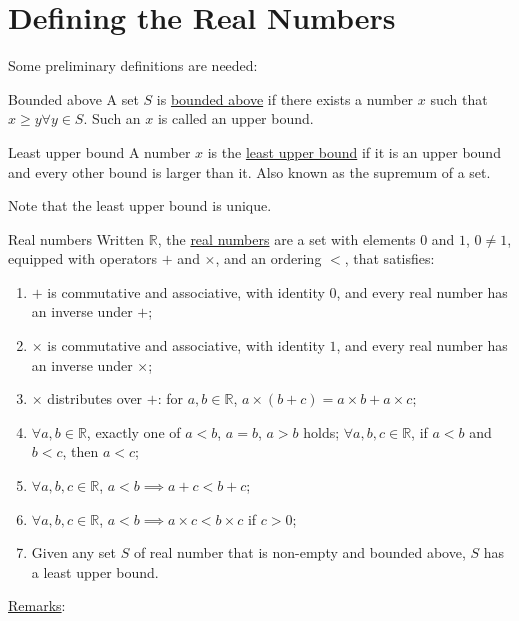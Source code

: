 \documentclass[../Main.tex]{subfiles}
\begin{document}
\section{Defining the Real Numbers}
Some preliminary definitions are needed:
\begin{definition}{Bounded above}
    A set $S$ is \underline{bounded above} if there exists a number $x$ such that $x\geq y \forall y \in S$. Such an $x$ is called an upper bound.
\end{definition}
\begin{definition}{Least upper bound}
    A number $x$ is the \underline{least upper bound} if it is an upper bound and every other bound is larger than it. Also known as the supremum of a set.
\end{definition}
Note that the least upper bound is unique.
\begin{definition}{Real numbers}
    Written $\mathbb{R}$, the \underline{real numbers} are a set with elements $0$ and $1$, $0\neq 1$, equipped with operators $+$ and $\times$, and an ordering $<$, that satisfies:
    \begin{enumerate}
        \item $+$ is commutative and associative, with identity $0$, and every real number has an inverse under $+$;\label{realAxiomAddition}
        \item $\times$ is commutative and associative, with identity $1$, and every real number has an inverse under $\times$;\label{realAxiomMultn}
        \item $\times$ distributes over $+$: for $a, b \in \mathbb{R}$, $a\times(b+c)=a\times b + a \times c$;\label{realAxiomDist}
        \item $\forall a, b \in \mathbb{R}$, exactly one of $a<b$, $a=b$, $a>b$ holds; $\forall a, b, c \in \mathbb{R}$, if $a<b$ and $b<c$, then $a<c$;\label{realAxiomOrdering}
        \item $\forall a, b, c \in \mathbb{R}$, $a<b \implies a+c<b+c$;\label{realAxiomAddOrder}
        \item $\forall a, b, c \in \mathbb{R}$, $a<b \implies a\times c<b\times c$ if $c>0$;\label{realAxiomMultOrder}
        \item Given any set $S$ of real number that is non-empty and bounded above, $S$ has a least upper bound.\label{realAxiomLUB}
    \end{enumerate}
\end{definition}
\underline{Remarks}:
\end{document}
